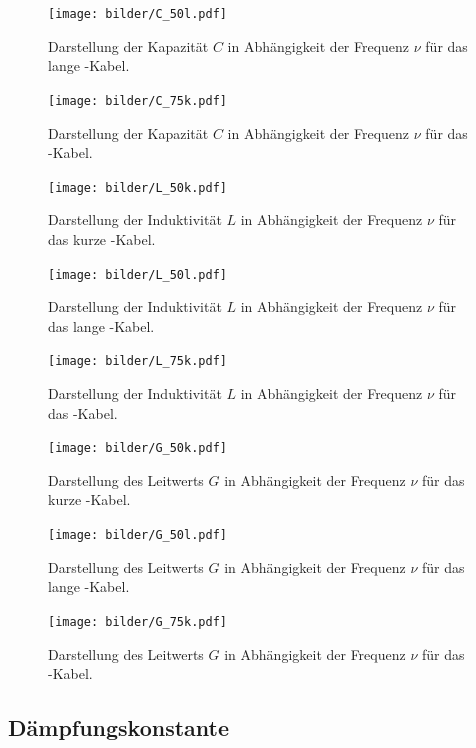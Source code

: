 \begin{figure}[h!]
	\centering
	\texttt{[image: bilder/C\_50l.pdf]}
	\caption{Darstellung der Kapazität $C$ in Abhängigkeit der Frequenz $\nu$
	für das lange \CU-Kabel.}
	\label{fig:C_50l}
	\texttt{[image: bilder/C\_75k.pdf]}
	\caption{Darstellung der Kapazität $C$ in Abhängigkeit der Frequenz $\nu$
	für das \BU-Kabel.}
	\label{fig:C_75k}
\end{figure}

\begin{figure}[h!]
	\centering
	\texttt{[image: bilder/L\_50k.pdf]}
	\caption{Darstellung der Induktivität $L$ in Abhängigkeit der Frequenz $\nu$
	für das kurze \CU-Kabel.}
	\label{fig:L_50k}
	\texttt{[image: bilder/L\_50l.pdf]}
	\caption{Darstellung der Induktivität $L$ in Abhängigkeit der Frequenz $\nu$
	für das lange \CU-Kabel.}
	\label{fig:L_50l}
\end{figure}

\begin{figure}[h!]
	\centering
	\texttt{[image: bilder/L\_75k.pdf]}
	\caption{Darstellung der Induktivität $L$ in Abhängigkeit der Frequenz $\nu$
	für das \BU-Kabel.}
	\label{fig:L_75k}
	\texttt{[image: bilder/G\_50k.pdf]}
	\caption{Darstellung des Leitwerts $G$ in Abhängigkeit der Frequenz $\nu$
	für das kurze \CU-Kabel.}
	\label{fig:G_50k}
\end{figure}

\begin{figure}[h!]
	\centering
	\texttt{[image: bilder/G\_50l.pdf]}
	\caption{Darstellung des Leitwerts $G$ in Abhängigkeit der Frequenz $\nu$
	für das lange \CU-Kabel.}
	\label{fig:G_50l}
	\texttt{[image: bilder/G\_75k.pdf]}
	\caption{Darstellung des Leitwerts $G$ in Abhängigkeit der Frequenz $\nu$
	für das \BU-Kabel.}
	\label{fig:G_75k}
\end{figure}


\clearpage
\subsection{Dämpfungskonstante}
\label{sub:d_mpfungskonstante}

